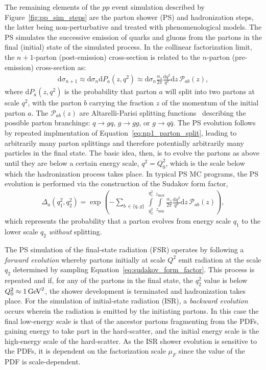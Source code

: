 The remaining elements of the $pp$ event simulation described by Figure~\ref{fig:pp_sim_steps} are the parton shower (PS)
and hadronization steps, the latter being non-perturbative and treated with phenomenological models.
The PS simulates the successive emission of quarks and gluons from the partons in the final (initial) state of the
simulated process.
In the collinear factorization limit, the $n+1$-parton (post-emission) cross-section is related to the $n$-parton (pre-emission) cross-section
as:
\begin{align}
    \mathrm{d}\sigma_{n+1} \approx \mathrm{d}\sigma_n \mathrm{d}P_a(z, q^2) \approx \mathrm{d}\sigma_n \frac{\alpha_s}{2\pi} \frac{\mathrm{d}q^2}{q^2} \mathrm{d}z \, \mathcal{P}_{ab}(z),
    \label{eq:np1_parton_split}
\end{align}
where $\mathrm{d}P_a(z,q^2)$ is the probability that parton $a$ will split into two partons at scale $q^2$, with the parton $b$ carrying the
fraction $z$ of the momentum of the initial parton $a$.
The $\mathcal{P}_{ab}(z)$ are Altarelli-Parisi splitting functions~\cite{Altarelli:1977zs} describing the possible parton branchings: $q \rightarrow gq$, $g \rightarrow gg$, 
or $g \rightarrow q\bar{q}$.
The PS evolution follows by repeated implmentation of Equation~\ref{eq:np1_parton_split}, leading to arbitrarily many
parton splittings and therefore potentially arbitrarily many particles in the final state.
The basic idea, then, is to evolve the partons as above until they are below a certain energy scale, $q^2 = Q_0^2$, which is the scale
below which the hadronization process takes place.
In typical PS MC programs, the PS evolution is performed via the construction of the Sudakov form factor,
\begin{align}
    \Delta_{a}(q_1^2, q_2^2) = \exp \left ( - \sum\limits_{b\, \in \{q,g\}} \, \int\limits_{q_2^2}^{q_1^2} \int\limits_{z_{\text{min}}}^{z_{\text{max}}} \frac{\alpha_s}{2\pi} \frac{\mathrm{d}q^2}{q^2} \mathrm{d}z \, \mathcal{P}_{ab}(z) \right),
    \label{eq:sudakov_form_factor}
\end{align}
which represents the probability that a parton evolves from energy scale $q_1$ to the lower scale $q_2$ \textit{without} splitting.

The PS simulation of the final-state radiation (FSR) operates by following a \textit{forward evolution} whereby partons initially at scale $Q^2$
emit radiation at the scale $q_2$ determined by sampling Equation~\ref{eq:sudakov_form_factor}. This process is repeated and if,
for any of the partons in the final state, the $q_2^2$ value is below $Q_0^2 \approx 1\,\text{Ge\kern -0.1em V}^2$, the shower development is terminated
and hadronization takes place.
For the simulation of initial-state radiation (ISR), a \textit{backward evolution} occurs wherein the radiation is emitted
by the initiating partons. In this case the final low-energy scale is that of the ancestor partons fragmenting from the PDFs, gaining energy to take part
in the hard-scatter, and the initial energy scale is the high-energy scale of the hard-scatter.
As the ISR shower evolution is sensitive to the PDFs, it is dependent on the factorization scale $\mu_F$ since the
value of the PDF is scale-dependent.

